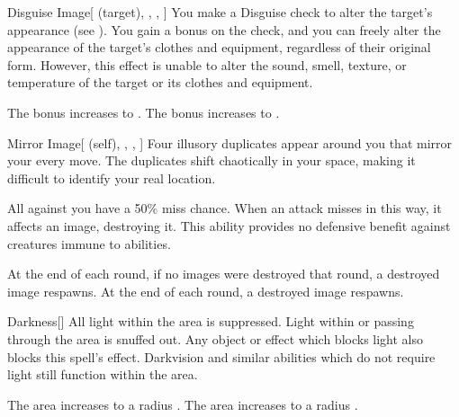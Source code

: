 \lowercase{\hypertarget{spell:Disguise Image}{}}\label{spell:Disguise Image}
\begin{attuneability}[Rank 3]{\hypertarget{spell:Disguise Image}{Disguise Image}}[ (target), , , ]
You make a Disguise check to alter the target's appearance (see ).
You gain a  bonus on the check, and you can freely alter the appearance of the target's clothes and equipment, regardless of their original form.
However, this effect is unable to alter the sound, smell, texture, or temperature of the target or its clothes and equipment.

\rankline
{} The bonus increases to .
 The bonus increases to .
\end{attuneability}
\vspace{0.25em}



\lowercase{\hypertarget{spell:Mirror Image}{}}\label{spell:Mirror Image}
\begin{attuneability}[Rank 3]{\hypertarget{spell:Mirror Image}{Mirror Image}}[ (self), , , ]
Four illusory duplicates appear around you that mirror your every move.
The duplicates shift chaotically in your space, making it difficult to identify your real location.

All  against you have a 50\% miss chance.
When an attack misses in this way, it affects an image, destroying it.
This ability provides no defensive benefit against creatures immune to  abilities.

\rankline
{} At the end of each round, if no images were destroyed that round, a destroyed image respawns.
 At the end of each round, a destroyed image respawns.
\end{attuneability}
\vspace{0.25em}



\lowercase{\hypertarget{spell:Darkness}{}}\label{spell:Darkness}
\begin{freeability}[Rank 4]{\hypertarget{spell:Darkness}{Darkness}}[]
All light within the area is suppressed.
Light within or passing through the area is snuffed out.
Any object or effect which blocks light also blocks this spell's effect.
Darkvision and similar abilities which do not require light still function within the area.

\rankline
{} The area increases to a \arealarge radius .
 The area increases to a \areaext radius .
\end{freeability}
\vspace{0.25em}




